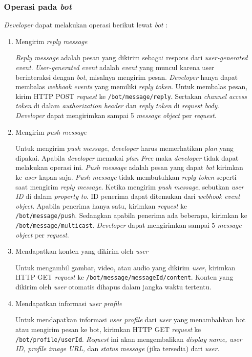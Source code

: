 \subsubsection{Operasi pada \textit{bot}}
\textit{Developer} dapat melakukan operasi berikut lewat \textit{bot} :
\begin{enumerate}
\item Mengirim \textit{reply message}

\textit{Reply message} adalah pesan yang dikirim sebagai respons dari \textit{user-generated event}. \textit{User-generated event} adalah \textit{event} yang muncul karena user berinteraksi dengan \textit{bot}, misalnya mengirim pesan. \textit{Developer} hanya dapat membalas \textit{webhook events} yang memiliki \textit{reply token}.
Untuk membalas pesan, kirim HTTP POST \textit{request} ke \texttt{/bot/message/reply}. Sertakan \textit{channel access token} di dalam \textit{authorization header} dan \textit{reply token} di \textit{request body}. \textit{Developer} dapat mengirimkan sampai 5 \textit{message object} per \textit{request}.

\item Mengirim \textit{push message}

Untuk mengirim \textit{push message}, \textit{developer} harus memerhatikan \textit{plan} yang dipakai. Apabila \textit{developer} memakai \textit{plan Free} maka \textit{developer} tidak dapat melakukan operasi ini. \textit{Push message} adalah pesan yang dapat \textit{bot} kirimkan ke \textit{user} kapan saja. \textit{Push message} tidak membutuhkan \textit{reply token} seperti saat mengirim \textit{reply message}. Ketika mengirim \textit{push message}, sebutkan \textit{user ID} di dalam \textit{property to}. ID penerima dapat ditemukan dari \textit{webhook event object}. Apabila penerima hanya satu, kirimkan \textit{request} ke \texttt{/bot/message/push}. Sedangkan apabila penerima ada beberapa, kirimkan ke \texttt{/bot/message/multicast}. \textit{Developer} dapat mengirimkan sampai 5 \textit{message object} per \textit{request}.

\item Mendapatkan konten yang dikirim oleh \textit{user}

Untuk mengambil gambar, video, atau audio yang dikirim \textit{user}, kirimkan HTTP GET \textit{request} ke \texttt{/bot/message/{messageId}/content}. Konten yang dikirim oleh \textit{user} otomatis dihapus dalam jangka waktu tertentu.

\item Mendapatkan informasi \textit{user profile}

Untuk mendapatkan informasi \textit{user profile} dari \textit{user} yang menambahkan bot atau mengirim pesan ke bot, kirimkan HTTP GET \textit{request} ke \texttt{/bot/profile/{userId}}. \textit{Request} ini akan mengembalikan \textit{display name, user ID, profile image URL,} dan \textit{status message} (jika tersedia) dari \textit{user}.
\end{enumerate}

